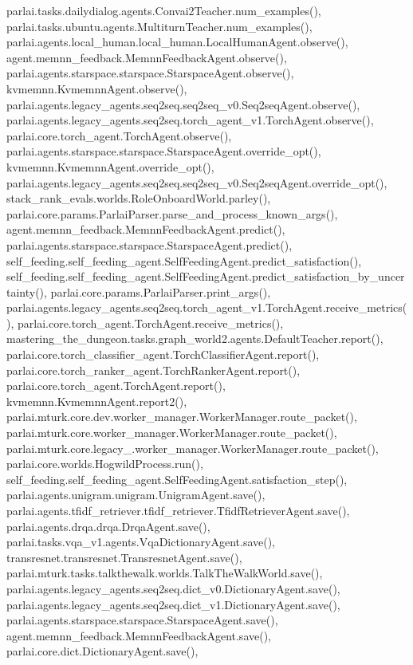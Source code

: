 parlai.\+tasks.\+dailydialog.\+agents.\+Convai2\+Teacher.\+num\+\_\+examples(), parlai.\+tasks.\+ubuntu.\+agents.\+Multiturn\+Teacher.\+num\+\_\+examples(), parlai.\+agents.\+local\+\_\+human.\+local\+\_\+human.\+Local\+Human\+Agent.\+observe(), agent.\+memnn\+\_\+feedback.\+Memnn\+Feedback\+Agent.\+observe(), parlai.\+agents.\+starspace.\+starspace.\+Starspace\+Agent.\+observe(), kvmemnn.\+Kvmemnn\+Agent.\+observe(), parlai.\+agents.\+legacy\+\_\+agents.\+seq2seq.\+seq2seq\+\_\+v0.\+Seq2seq\+Agent.\+observe(), parlai.\+agents.\+legacy\+\_\+agents.\+seq2seq.\+torch\+\_\+agent\+\_\+v1.\+Torch\+Agent.\+observe(), parlai.\+core.\+torch\+\_\+agent.\+Torch\+Agent.\+observe(), parlai.\+agents.\+starspace.\+starspace.\+Starspace\+Agent.\+override\+\_\+opt(), kvmemnn.\+Kvmemnn\+Agent.\+override\+\_\+opt(), parlai.\+agents.\+legacy\+\_\+agents.\+seq2seq.\+seq2seq\+\_\+v0.\+Seq2seq\+Agent.\+override\+\_\+opt(), stack\+\_\+rank\+\_\+evals.\+worlds.\+Role\+Onboard\+World.\+parley(), parlai.\+core.\+params.\+Parlai\+Parser.\+parse\+\_\+and\+\_\+process\+\_\+known\+\_\+args(), agent.\+memnn\+\_\+feedback.\+Memnn\+Feedback\+Agent.\+predict(), parlai.\+agents.\+starspace.\+starspace.\+Starspace\+Agent.\+predict(), self\+\_\+feeding.\+self\+\_\+feeding\+\_\+agent.\+Self\+Feeding\+Agent.\+predict\+\_\+satisfaction(), self\+\_\+feeding.\+self\+\_\+feeding\+\_\+agent.\+Self\+Feeding\+Agent.\+predict\+\_\+satisfaction\+\_\+by\+\_\+uncertainty(), parlai.\+core.\+params.\+Parlai\+Parser.\+print\+\_\+args(), parlai.\+agents.\+legacy\+\_\+agents.\+seq2seq.\+torch\+\_\+agent\+\_\+v1.\+Torch\+Agent.\+receive\+\_\+metrics(), parlai.\+core.\+torch\+\_\+agent.\+Torch\+Agent.\+receive\+\_\+metrics(), mastering\+\_\+the\+\_\+dungeon.\+tasks.\+graph\+\_\+world2.\+agents.\+Default\+Teacher.\+report(), parlai.\+core.\+torch\+\_\+classifier\+\_\+agent.\+Torch\+Classifier\+Agent.\+report(), parlai.\+core.\+torch\+\_\+ranker\+\_\+agent.\+Torch\+Ranker\+Agent.\+report(), parlai.\+core.\+torch\+\_\+agent.\+Torch\+Agent.\+report(), kvmemnn.\+Kvmemnn\+Agent.\+report2(), parlai.\+mturk.\+core.\+dev.\+worker\+\_\+manager.\+Worker\+Manager.\+route\+\_\+packet(), parlai.\+mturk.\+core.\+worker\+\_\+manager.\+Worker\+Manager.\+route\+\_\+packet(), parlai.\+mturk.\+core.\+legacy\+\_.\+worker\+\_\+manager.\+Worker\+Manager.\+route\+\_\+packet(), parlai.\+core.\+worlds.\+Hogwild\+Process.\+run(), self\+\_\+feeding.\+self\+\_\+feeding\+\_\+agent.\+Self\+Feeding\+Agent.\+satisfaction\+\_\+step(), parlai.\+agents.\+unigram.\+unigram.\+Unigram\+Agent.\+save(), parlai.\+agents.\+tfidf\+\_\+retriever.\+tfidf\+\_\+retriever.\+Tfidf\+Retriever\+Agent.\+save(), parlai.\+agents.\+drqa.\+drqa.\+Drqa\+Agent.\+save(), parlai.\+tasks.\+vqa\+\_\+v1.\+agents.\+Vqa\+Dictionary\+Agent.\+save(), transresnet.\+transresnet.\+Transresnet\+Agent.\+save(), parlai.\+mturk.\+tasks.\+talkthewalk.\+worlds.\+Talk\+The\+Walk\+World.\+save(), parlai.\+agents.\+legacy\+\_\+agents.\+seq2seq.\+dict\+\_\+v0.\+Dictionary\+Agent.\+save(), parlai.\+agents.\+legacy\+\_\+agents.\+seq2seq.\+dict\+\_\+v1.\+Dictionary\+Agent.\+save(), parlai.\+agents.\+starspace.\+starspace.\+Starspace\+Agent.\+save(), agent.\+memnn\+\_\+feedback.\+Memnn\+Feedback\+Agent.\+save(), parlai.\+core.\+dict.\+Dictionary\+Agent.\+save(), 